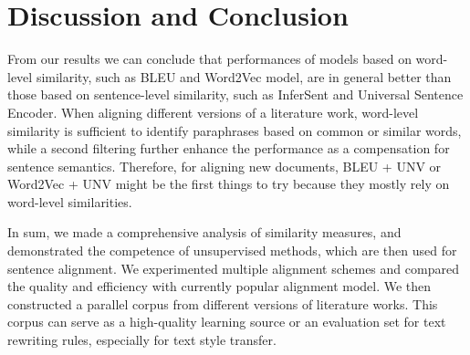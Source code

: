 \section{Discussion and Conclusion}

From our results we can conclude that performances of models based on word-level similarity, such as BLEU and Word2Vec model, are in general better than those based on sentence-level similarity, such as InferSent and Universal Sentence Encoder. When aligning different versions of a literature work, word-level similarity is sufficient to identify paraphrases based on common or similar words, while a second filtering further enhance the performance as a compensation for sentence semantics. Therefore, for aligning new documents, BLEU + UNV or Word2Vec + UNV might be the first things to try because they mostly rely on word-level similarities.

In sum, we made a comprehensive analysis of similarity measures, and demonstrated the competence of unsupervised methods, which are then used for sentence alignment. We experimented multiple alignment schemes and compared the quality and efficiency with currently popular alignment model. We then constructed a parallel corpus from different versions of literature works. This corpus can serve as a high-quality learning source or an evaluation set for text rewriting rules, especially for text style transfer.
